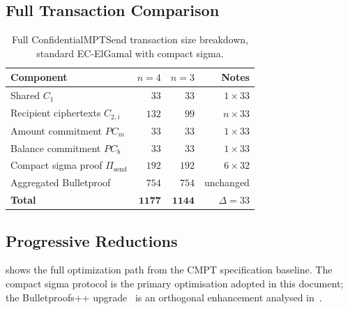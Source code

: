 \documentclass[11pt]{article}
\theoremstyle{definition}
\begin{document}
\subsection{Full Transaction Comparison}

\begin{table}[htbp]
  \centering
  \caption{%
    Full \textsf{ConfidentialMPTSend} transaction size breakdown,
    standard EC-ElGamal with compact sigma.}
  \label{tab:full-breakdown}
  \begin{tabular}{l@{\quad}rrr}
    \toprule
    Component & $n = 4$ & $n = 3$ & Notes \\
    \midrule
    Shared $C_1$
      & $33$ & $33$ & $1 \times 33$ \\
    Recipient ciphertexts $C_{2,i}$
      & $132$ & $99$ & $n \times 33$ \\
    Amount commitment $\mathit{PC}_m$
      & $33$ & $33$ & $1 \times 33$ \\
    Balance commitment $\mathit{PC}_b$
      & $33$ & $33$ & $1 \times 33$ \\
    \midrule
    Compact sigma proof $\Pi_{\mathrm{send}}$
      & $192$ & $192$ & $6 \times 32$ \\
    Aggregated Bulletproof
      & $754$ & $754$ & unchanged \\
    \midrule
    \textbf{Total}
      & $\mathbf{1177}$ & $\mathbf{1144}$ & $\Delta = 33$ \\
    \bottomrule
  \end{tabular}
\end{table}

\subsection{Progressive Reductions}

 shows the full optimization path from the CMPT
specification baseline.
The compact sigma protocol is the primary optimisation adopted in
this document; the Bulletproofs++ upgrade~\cite{Eagen2023bppp} is an
orthogonal enhancement analysed in~\cite{Dore2026bppp}.
\end{document}
